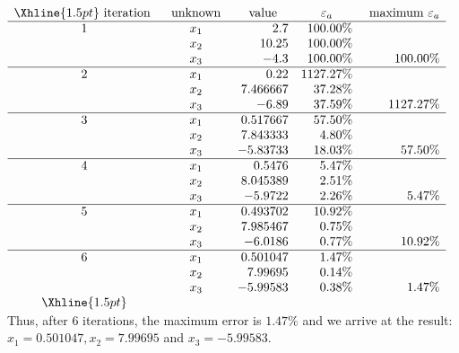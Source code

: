 \documentclass[../main.tex]{subfiles}
\begin{document}
\begin{enumerate}[label=\bfseries(\alph*)]
$\begin{array}{ccrrr}
\Xhline{1.5pt} \text { iteration } & \text { unknown } & \multicolumn{1}{c}{\text { value }} & \multicolumn{1}{c}{\varepsilon_{a}} & \text { maximum } \varepsilon_{a} \\
\hline 1 & x_{1} & 2.7 & 100.00 \% & \\
& x_{2} & 10.25 & 100.00 \% & \\
& x_{3} & -4.3 & 100.00 \% & 100.00 \% \\
\hline 2 & x_{1} & 0.22 & 1127.27 \% & \\
& x_{2} & 7.466667 & 37.28 \% & \\
& x_{3} & -6.89 & 37.59 \% & 1127.27 \% \\
\hline 3 & x_{1} & 0.517667 & 57.50 \% & \\
& x_{2} & 7.843333 & 4.80 \% & \\
& x_{3} & -5.83733 & 18.03 \% & 57.50 \% \\
\hline 4 & x_{1} & 0.5476 & 5.47 \% & \\
& x_{2} & 8.045389 & 2.51 \% & \\
& x_{3} & -5.9722 & 2.26 \% & 5.47 \% \\
\hline 5 & x_{1} & 0.493702 & 10.92 \% & \\
& x_{2} & 7.985467 & 0.75 \% & \\
& x_{3} & -6.0186 & 0.77 \% & 10.92 \% \\
\hline 6 & x_{1} & 0.501047 & 1.47 \% & \\
& x_{2} & 7.99695 & 0.14 \% & \\
& x_{3} & -5.99583 & 0.38 \% & 1.47 \% \\
\Xhline{1.5pt}
\end{array}$
\bigbreak
Thus, after 6 iterations, the maximum error is $1.47 \%$ and we arrive at the result: $x_{1}=$\smallbreak $0.501047, x_{2}=7.99695$ and $x_{3}=-5.99583$.
\bigbreak


\section{}


\end{enumerate}
\end{document}
